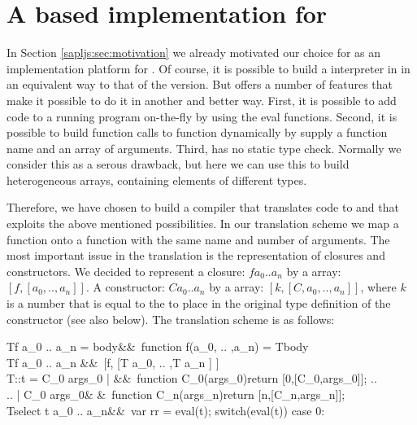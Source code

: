 \section{A \JS based implementation for  \Sapl}\label{sapljs:sec:sapljs}
In Section \ref{sapljs:sec:motivation} we already motivated our choice for \JS as an implementation platform for \Sapl.
Of course, it is possible to build a \Sapl interpreter in \JS in an equivalent way to that of the \Java version.
But \JS offers a number of features that make it possible to do it in another and better way.
First, it is possible to add \JS code to a running \JS program on-the-fly by using the \textsf{eval} functions.
Second, it is possible to build function calls to \JS function dynamically by supply a function name and an array of arguments.
Third, \JS has no static type check. Normally we consider this as a serous drawback, but here we can use this to build heterogeneous arrays,
containing elements of different types.

Therefore, we have chosen to build a compiler that translates \Sapl code to \JS and that exploits the above mentioned possibilities.
In our translation scheme we map a \Sapl function onto a \JS function with the same name and number of arguments.
The most important issue in the translation is the representation of closures and constructors.
We decided to represent a closure: $f a_0 .. a_n$ by a \JS array: $[f,[a_0, .. ,a_n]]$.
A constructor:  $C a_0 .. a_n$ by a \JS array: $[k,[C,a_0, .. ,a_n]]$, where $k$ is a number that is equal to the 
to place in the original type definition of the constructor (see also below).
The translation scheme is as follows:

\begin{haskell}
T\llbracket f a_0 .. a_n = body\rrbracket  &\equiv &\ function f(a_0, .. ,a_n) = T\llbracket body \rrbracket \\ 
T\llbracket f a_0 .. a_n \rrbracket &\equiv  &\ [f, [T \llbracket a_0\rrbracket , .. ,T \llbracket a_n ] ]\\
T\llbracket ::t = C_0  args_0  |   &\equiv  &\    function C_0(args_0){return [0,[C_0,args_0]];} .. \\
\hspace{1.15cm}.. | C_0  args_0\rrbracket   & &\ function C_n(args_n){return [n,[C_n,args_n]];} \\ 
T\llbracket select t a_0 .. a_n\rrbracket &\equiv  &\ var rr = eval(t); switch(eval(t)) {case 0: }
\end{haskell}

